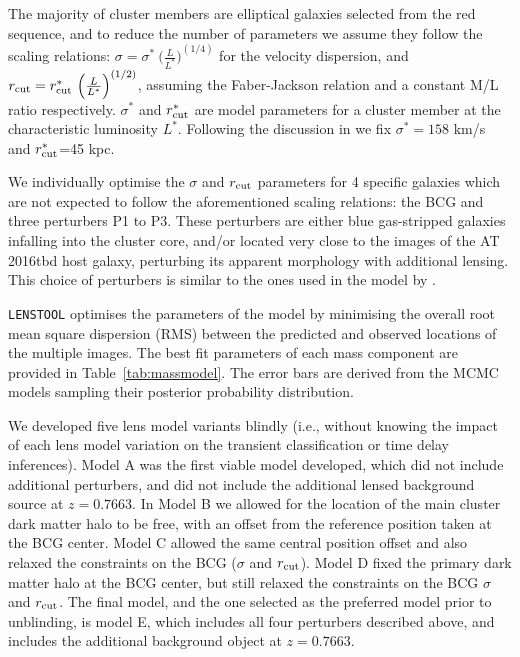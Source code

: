 \documentclass[12pt]{article}
\def\SNABC{AT 2016tbd\xspace}
\def\lenstool{{\tt LENSTOOL}\xspace}
\begin{document}
The majority of cluster members are elliptical galaxies selected from the red sequence, and to reduce the number of parameters we assume they follow the scaling relations: $\sigma=\sigma^*\ {\Big(\frac{L}{L^*}\Big)}^{(1/4)}$ for the velocity dispersion, 
and $r_{\rm cut}=r_{\rm cut}^*\ {\Big(\frac{L}{L^*}\Big)}^{(1/2)}$, assuming the Faber-Jackson relation and a constant M/L ratio respectively. $\sigma^*$ and $r^*_{\rm cut}$ are model parameters for a cluster member at the characteristic luminosity $L^*$.  Following the discussion in \cite{richard_locuss_2010} we fix $\sigma^*=158$ km/s and $r_{\rm cut}^*$=45 kpc. 

We individually optimise the $\sigma$ and $r_{\rm cut}$ parameters for 4 specific galaxies which are not expected to follow the aforementioned scaling relations: the BCG and three perturbers P1 to P3. These perturbers are either blue gas-stripped galaxies infalling into the cluster core, and/or located very close to the images of the \SNABC host galaxy, perturbing its apparent morphology with additional lensing. This choice of perturbers is similar to the ones used in the model by \cite{newman_resolving_2018}.

\lenstool optimises the parameters of the model by minimising the overall root mean square dispersion (RMS) between the predicted and observed locations of the multiple images. The best fit parameters of each mass component are provided in Table~\ref{tab:massmodel}. The error bars are derived from the MCMC models sampling their posterior probability distribution. 

We developed five lens model variants blindly (i.e., without knowing the impact of each lens model variation on the transient classification or time delay inferences). Model A was the first viable model developed, which did not include additional perturbers, and did not include the additional lensed background source at $z=0.7663$.   In Model B we allowed for the location of the main cluster dark matter halo to be free, with an offset from the reference position taken at the BCG center.  Model C allowed the same central position offset and also relaxed the constraints on the BCG ($\sigma$ and $r_{\rm cut}$).  Model D fixed the primary dark matter halo at the BCG center, but still relaxed the constraints on the BCG $\sigma$ and $r_{\rm cut}$.
The final model, and the one selected as the preferred model prior to unblinding, is model E, which includes all four perturbers described above, and includes the additional background object at $z=0.7663$.
\end{document}
